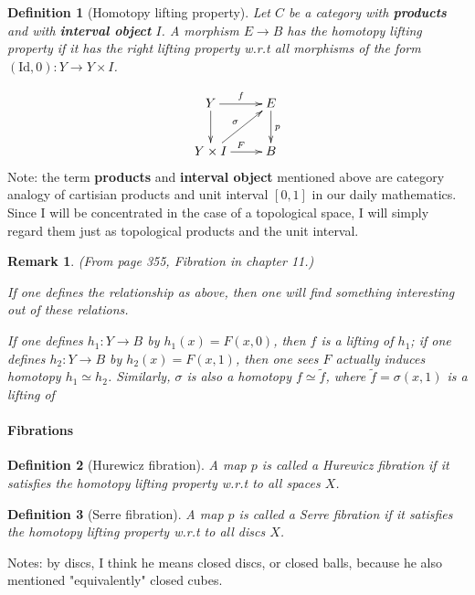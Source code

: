 \documentclass{article}
\numberwithin{equation}{subsection} %
\newtheorem{defi}{Definition}[section]
\newtheorem{remark}{Remark}[section]
\theoremstyle{definition}
\begin{document}
    \begin{defi}[Homotopy lifting property]
    Let $C$ be a category with \textbf{products} and with \textbf{interval
    object} $I$. A morphism $E\to B$ has the homotopy lifting property if it
    has the right lifting property w.r.t all morphisms of the form
    $(\text{Id},0):Y \to Y\times I$.
    \end{defi}
    $$ \xymatrix{
        Y\ar[r]^f\ar[d]                 & E\ar[d]^p \\
        Y\times I\ar[r]^F\ar[ru]^\sigma & B
    }$$
    Note: the term \textbf{products} and \textbf{interval object} mentioned
    above are category analogy of cartisian products and unit interval $[0,1]$
    in our daily mathematics. Since I will be concentrated in the case of a
    topological space, I will simply regard them just as topological products
    and the unit interval.

    \begin{remark}
        (From page 355, Fibration in chapter 11.)

        If one defines the relationship as above, then one will find
        something interesting out of these relations.

        If one defines $h_1:Y\to B$ by $h_1(x)=F(x,0)$, then $f$ is a
        lifting of $h_1$; if one defines $h_2:Y\to B$ by $h_2(x)=F(x,1)$,
        then one sees $F$ actually induces homotopy $h_1\simeq h_2$.
        Similarly, $\sigma$ is also a homotopy $f\simeq \widetilde f$,
        where $\widetilde f=\sigma(x,1)$ is a lifting of 
    \end{remark}
    \paragraph{Fibrations}
    \begin{defi}[Hurewicz fibration]
        A map $p$ is called a Hurewicz fibration if it satisfies the homotopy
        lifting property w.r.t to all spaces $X$.
    \end{defi}
    \begin{defi}[Serre fibration]
        A map $p$ is called a Serre fibration if it satisfies the homotopy
        lifting property w.r.t to all discs $X$.
    \end{defi}
    Notes: by discs, I think he means closed discs, or closed balls, because he
    also mentioned "equivalently" closed cubes.
\end{document}
